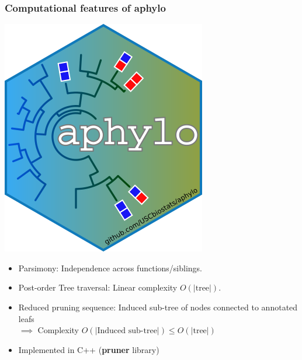 \documentclass[aspectratio=169,9pt,handout]{beamer}
\begin{document}
\begin{frame}
	\frametitle{Computational features of \textbf{aphylo}}
	\begin{minipage}[m]{.55\linewidth}
		\vspace{-1cm}\raggedleft\includegraphics[width=.35\linewidth]{aphylo-logo.png}\\\vspace{-.5cm}
		\raggedright
		\small
		\begin{itemize}
			\item<2-> Parsimony: Independence across functions/siblings.
			\item<3-> Post-order Tree traversal: Linear complexity $O(|\mbox{tree}|)$.
		\end{itemize}
		\begin{itemize}
			\item<5-> Reduced pruning sequence: Induced sub-tree of nodes connected to annotated leafs\\ $\implies$ Complexity $O(\left|\mbox{Induced sub-tree}\right|)\leq O(|\mbox{tree}|)$
			\item<6-> Implemented in C++ (\textbf{pruner} library)
		\end{itemize}
	\end{minipage}\hfill
	\begin{minipage}[m]{.44\linewidth}
		\centering
	\end{minipage}
\end{frame}
\end{document}
